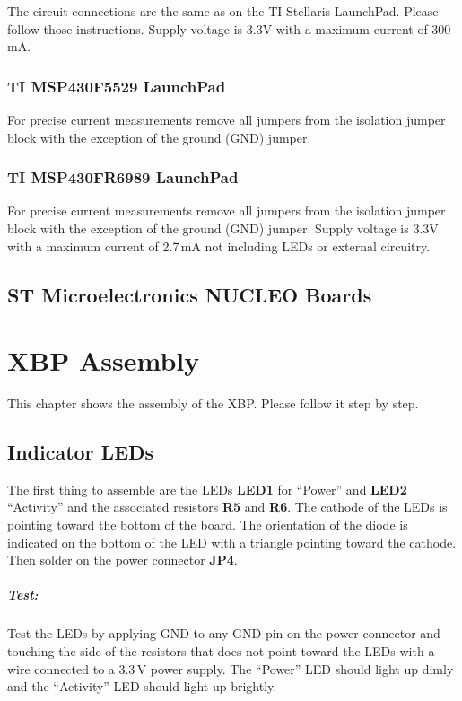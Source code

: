 \documentclass[twoside,11pt]{cergdoc}
\begin{document}
The circuit connections are the same as on the TI Stellaris LaunchPad. Please follow
those instructions. Supply voltage is 3.3V with a maximum current of 300\,mA.

\subsection{TI MSP430F5529 LaunchPad\texttrademark}

For precise current measurements remove all jumpers from the isolation jumper block 
with the exception of the ground (GND) jumper. 

\subsection{TI MSP430FR6989 LaunchPad\texttrademark}

For precise current measurements remove all jumpers from the isolation jumper block 
with the exception of the ground (GND) jumper. Supply voltage is 3.3V with a maximum 
current of 2.7\,mA not including LEDs or external circuitry.

\section{ST Microelectronics NUCLEO Boards}


\chapter{XBP Assembly}
This chapter shows the assembly of the XBP. Please follow it step by step. 

\section{Indicator LEDs}
The first thing to assemble are the LEDs \textbf{LED1} for ``Power'' and 
\textbf{LED2} ``Activity'' and the associated resistors \textbf{R5} and
\textbf{R6}. The cathode of the LEDs is pointing toward the bottom of the
board. The orientation of the diode is indicated on the bottom of the LED 
with a triangle pointing toward the cathode. 
Then solder on the power connector \textbf{JP4}.

\paragraph{Test:} Test the
LEDs by applying GND to any GND pin on the power connector and touching the side 
of the resistors that does not point toward the LEDs with a wire connected to a 
3.3\,V power supply. The
``Power'' LED should light up dimly and the ``Activity'' LED should light up brightly.
\end{document}
